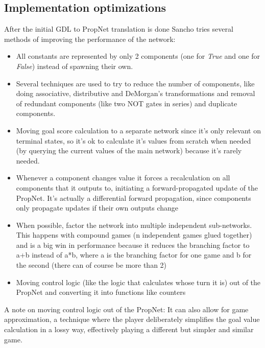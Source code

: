 \subsection{Implementation optimizations}
After the initial GDL to PropNet translation is done Sancho tries several methods of improving the performance of the network:
\begin{itemize}
	\item All constants are represented by only 2 components (one for \textit{True} and one for \textit{False}) instead of spawning their own.	
	
	\item Several techniques are used to try to reduce the number of components, like doing associative, distributive and DeMorgan's transformations and removal of redundant components (like two NOT gates in series) and duplicate components. 

	\item Moving goal score calculation to a separate network since it's only relevant on terminal states, so it's ok to calculate it's values from scratch when needed (by querying the current values of the main network) because it's rarely needed.
	
	\item Whenever a component changes value it forces a recalculation on all components that it outputs to,  initiating a forward-propagated update of the PropNet.
	It's actually a differential forward propagation, since components only propagate updates if their own outputs change
	
	\item When possible, factor the network into multiple independent sub-networks. This happens with compound games (n independent games glued together) and is a big win in performance because it reduces the branching factor to a+b instead of a*b, where a is the branching factor for one game and b for the second (there can of course be more than 2)
	
	\item Moving control logic (like the logic that calculates whose turn it is) out of the PropNet and converting it into functions like counters
	
\end{itemize}

A note on moving control logic out of the PropNet: It can also allow for game approximation, a technique where the player deliberately simplifies the goal value calculation in a lossy way, effectively playing a different but simpler and similar game.

